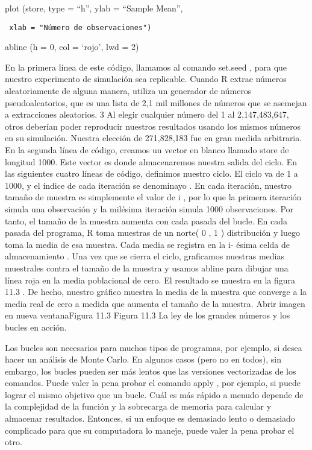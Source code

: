 \documentclass[
]{book}
\begin{document}
plot (store, type = ``h'', ylab = ``Sample Mean'',

\begin{verbatim}
 xlab = "Número de observaciones")
\end{verbatim}

abline (h = 0, col = `rojo', lwd = 2)

En la primera línea de este código, llamamos al comando set.seed , para que nuestro experimento de simulación sea replicable. Cuando R extrae números aleatoriamente de alguna manera, utiliza un generador de números pseudoaleatorios, que es una lista de 2,1 mil millones de números que se asemejan a extracciones aleatorios. 3 Al elegir cualquier número del 1 al 2,147,483,647, otros deberían poder reproducir nuestros resultados usando los mismos números en su simulación. Nuestra elección de 271,828,183 fue en gran medida arbitraria. En la segunda línea de código, creamos un vector en blanco llamado store de longitud 1000. Este vector es donde almacenaremos nuestra salida del ciclo. En las siguientes cuatro líneas de código, definimos nuestro ciclo. El ciclo va de 1 a 1000, y el índice de cada iteración se denominayo . En cada iteración, nuestro tamaño de muestra es simplemente el valor de i , por lo que la primera iteración simula una observación y la milésima iteración simula 1000 observaciones. Por tanto, el tamaño de la muestra aumenta con cada pasada del bucle. En cada pasada del programa, R toma muestras de un norte( 0 , 1 ) distribución y luego toma la media de esa muestra. Cada media se registra en la i- ésima celda de almacenamiento . Una vez que se cierra el ciclo, graficamos nuestras medias muestrales contra el tamaño de la muestra y usamos abline para dibujar una línea roja en la media poblacional de cero. El resultado se muestra en la figura  11.3 . De hecho, nuestro gráfico muestra la media de la muestra que converge a la media real de cero a medida que aumenta el tamaño de la muestra.
Abrir imagen en nueva ventanaFigura 11.3
Figura 11.3
La ley de los grandes números y los bucles en acción.

Los bucles son necesarios para muchos tipos de programas, por ejemplo, si desea hacer un análisis de Monte Carlo. En algunos casos (pero no en todos), sin embargo, los bucles pueden ser más lentos que las versiones vectorizadas de los comandos. Puede valer la pena probar el comando apply , por ejemplo, si puede lograr el mismo objetivo que un bucle. Cuál es más rápido a menudo depende de la complejidad de la función y la sobrecarga de memoria para calcular y almacenar resultados. Entonces, si un enfoque es demasiado lento o demasiado complicado para que su computadora lo maneje, puede valer la pena probar el otro.
\end{document}
